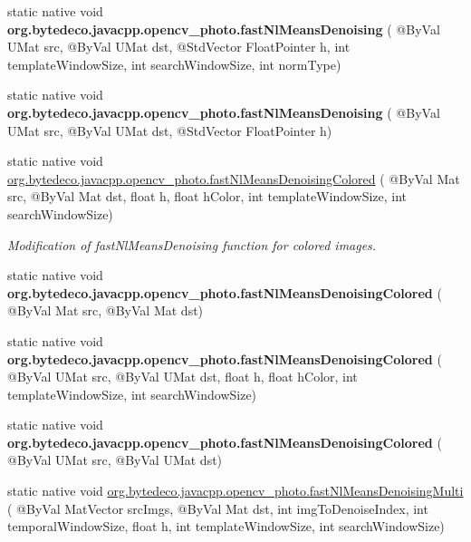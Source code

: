 \begin{DoxyCompactItemize}
static native void {\bfseries org.\+bytedeco.\+javacpp.\+opencv\+\_\+photo.\+fast\+Nl\+Means\+Denoising} ( @By\+Val U\+Mat src, @By\+Val U\+Mat dst, @Std\+Vector Float\+Pointer h, int template\+Window\+Size, int search\+Window\+Size, int norm\+Type)
\item 
\mbox{\label{group__photo__denoise_ga0bf8eb6fa0778f982af455f9627dd2da}} 
static native void {\bfseries org.\+bytedeco.\+javacpp.\+opencv\+\_\+photo.\+fast\+Nl\+Means\+Denoising} ( @By\+Val U\+Mat src, @By\+Val U\+Mat dst, @Std\+Vector Float\+Pointer h)
\item 
static native void \hyperlink{group__photo__denoise_ga0e990dae474182098fcd723642e78888}{org.\+bytedeco.\+javacpp.\+opencv\+\_\+photo.\+fast\+Nl\+Means\+Denoising\+Colored} ( @By\+Val Mat src, @By\+Val Mat dst, float h, float h\+Color, int template\+Window\+Size, int search\+Window\+Size)
\begin{DoxyCompactList}\small\item\em Modification of fast\+Nl\+Means\+Denoising function for colored images. \end{DoxyCompactList}\item 
\mbox{\label{group__photo__denoise_gab6077e97bec843fa7d4bb848165198a5}} 
static native void {\bfseries org.\+bytedeco.\+javacpp.\+opencv\+\_\+photo.\+fast\+Nl\+Means\+Denoising\+Colored} ( @By\+Val Mat src, @By\+Val Mat dst)
\item 
\mbox{\label{group__photo__denoise_gad4db100bb45768f6113313abf4dbf510}} 
static native void {\bfseries org.\+bytedeco.\+javacpp.\+opencv\+\_\+photo.\+fast\+Nl\+Means\+Denoising\+Colored} ( @By\+Val U\+Mat src, @By\+Val U\+Mat dst, float h, float h\+Color, int template\+Window\+Size, int search\+Window\+Size)
\item 
\mbox{\label{group__photo__denoise_gaf1fcd4e85a8b99c9925e4f393aa6c10f}} 
static native void {\bfseries org.\+bytedeco.\+javacpp.\+opencv\+\_\+photo.\+fast\+Nl\+Means\+Denoising\+Colored} ( @By\+Val U\+Mat src, @By\+Val U\+Mat dst)
\item 
static native void \hyperlink{group__photo__denoise_gac776302e2aaffca0e057b8715f7faa1d}{org.\+bytedeco.\+javacpp.\+opencv\+\_\+photo.\+fast\+Nl\+Means\+Denoising\+Multi} ( @By\+Val Mat\+Vector src\+Imgs, @By\+Val Mat dst, int img\+To\+Denoise\+Index, int temporal\+Window\+Size, float h, int template\+Window\+Size, int search\+Window\+Size)

\end{DoxyCompactItemize}
